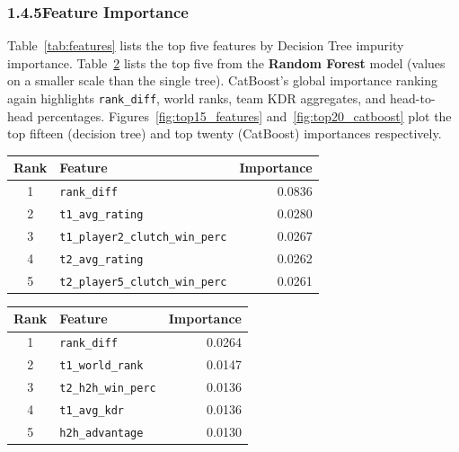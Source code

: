 \documentclass[12pt,a4paper]{article}
\begin{document}
\subsubsection{1.4.5\quad Feature Importance}

Table~\ref{tab:features} lists the top five features by Decision Tree impurity importance. Table~\ref{tab:rf_importance} lists the top five from the \textbf{Random Forest} model (values on a smaller scale than the single tree). CatBoost's global importance ranking again highlights \texttt{rank\_diff}, world ranks, team KDR aggregates, and head-to-head percentages. Figures~\ref{fig:top15_features} and~\ref{fig:top20_catboost} plot the top fifteen (decision tree) and top twenty (CatBoost) importances respectively.

\begin{table}[H]
\centering
\small
\setlength{\tabcolsep}{4pt}
\begin{minipage}[t]{0.49\textwidth}
\centering
{}
\label{tab:features}
\begin{tabularx}{\linewidth}{c >{\raggedright\arraybackslash}X r}
\toprule
\textbf{Rank} & \textbf{Feature} & \textbf{Importance} \\
\midrule
1 & \texttt{rank\_diff} & 0.0836 \\
2 & \texttt{t1\_avg\_rating} & 0.0280 \\
3 & \texttt{t1\_player2\_clutch\_win\_perc} & 0.0267 \\
4 & \texttt{t2\_avg\_rating} & 0.0262 \\
5 & \texttt{t2\_player5\_clutch\_win\_perc} & 0.0261 \\
\bottomrule
\end{tabularx}
\end{minipage}\hfill
\begin{minipage}[t]{0.49\textwidth}
\centering
{}
\label{tab:rf_importance}
\begin{tabularx}{\linewidth}{c >{\raggedright\arraybackslash}X r}
\toprule
\textbf{Rank} & \textbf{Feature} & \textbf{Importance} \\
\midrule
1 & \texttt{rank\_diff} & 0.0264 \\
2 & \texttt{t1\_world\_rank} & 0.0147 \\
3 & \texttt{t2\_h2h\_win\_perc} & 0.0136 \\
4 & \texttt{t1\_avg\_kdr} & 0.0136 \\
5 & \texttt{h2h\_advantage} & 0.0130 \\
\bottomrule
\end{tabularx}
\end{minipage}
\end{table}
\end{document}
